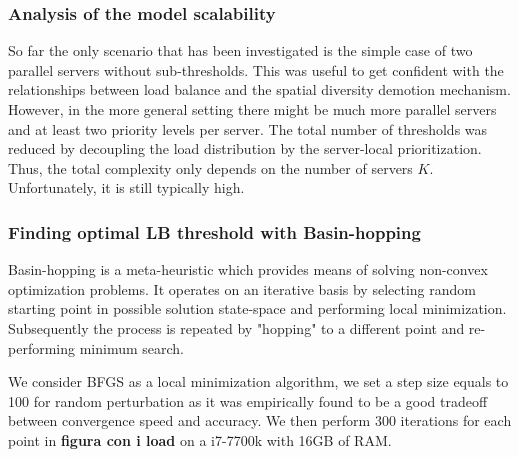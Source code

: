 \subsubsection{Analysis of the model scalability}
So far the only scenario that has been investigated is the simple case of two parallel servers without sub-thresholds. This was useful to get confident with the relationships between load balance and the spatial diversity demotion mechanism. However, in the more general setting there might be much more parallel servers and at least two priority levels per server. The total number of thresholds was reduced by decoupling the load distribution by the server-local prioritization. Thus, the total complexity only depends on the number of servers $K$. Unfortunately, it is still typically high. 

{\color{red}
\subsubsection{Finding optimal LB threshold with Basin-hopping}
Basin-hopping is a meta-heuristic which provides means of solving non-convex optimization problems.
It operates on an iterative basis by selecting random starting point in possible solution state-space and performing local minimization. 
Subsequently the process is repeated by "hopping" to a different point and re-performing minimum search.

We consider BFGS as a local minimization algorithm, we set a step size equals to 100 for random perturbation as it was empirically found to be a good tradeoff between convergence speed and accuracy.
We then perform 300 iterations for each point in \textbf{figura con i load} on a i7-7700k with 16GB of RAM.
}
